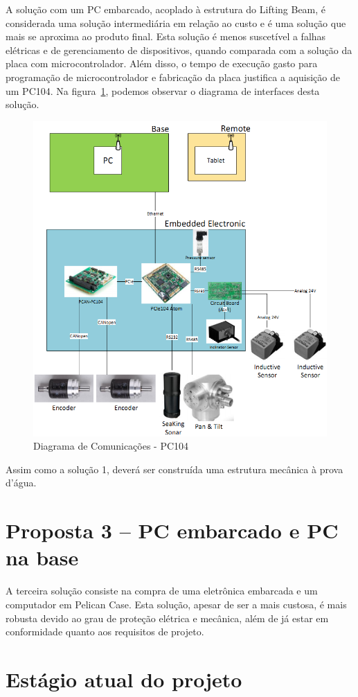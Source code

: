 A solução com um PC embarcado, acoplado à estrutura do Lifting Beam, é
considerada uma solução intermediária em relação ao custo e é uma solução que
mais se aproxima ao produto final. Esta solução é menos suscetível a falhas
elétricas e de gerenciamento de dispositivos, quando comparada com a solução da
placa com microcontrolador. Além disso, o tempo de execução gasto para programação de microcontrolador e fabricação da placa justifica a aquisição de um PC104. Na figura~\ref{pc104}, podemos observar o diagrama de interfaces desta solução.

\begin{figure}[H]
    \centering
    \includegraphics[width=0.5\columnwidth]{figs/eletronica/4.png}
    \caption{Diagrama de Comunicações - PC104}
    \label{pc104}
\end{figure} 
 
Assim como a solução 1, deverá ser construída uma estrutura mecânica à prova d’água.

\section{Proposta 3 – PC embarcado e PC na base}

A terceira solução consiste na compra de uma eletrônica embarcada e um computador em Pelican Case. Esta solução, apesar de ser a mais custosa, é mais robusta devido ao grau de proteção elétrica e mecânica, além de já estar em conformidade quanto aos requisitos de projeto.

\section{Estágio atual do projeto}

